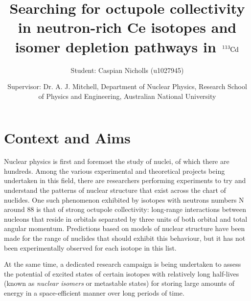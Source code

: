 \documentclass[12pt,a4paper]{article}
\begin{document}
\title{Searching for octupole collectivity in neutron-rich Ce isotopes and isomer depletion pathways in $\ce{^{113}Cd}$} %
\author{Student: Caspian Nicholls (u1027945)}
\date{Supervisor: Dr. A. J. Mitchell, Department of Nuclear Physics, Research School of Physics and Engineering, Australian National University}

%
%

\maketitle
\section*{Context and Aims}
\medskip
Nuclear physics is first and foremost the study of nuclei, of which there are hundreds. Among the various experimental and theoretical projects being undertaken in this field, there are researchers performing experiments to try and understand the patterns of nuclear structure that exist across the chart of nuclides. One such phenomenon exhibited by isotopes with neutrons numbers N around 88 is that of strong octupole collectivity: long-range interactions between nucleons that reside in orbitals separated by three units of both orbital and total angular momentum. Predictions based on models of nuclear structure have been made for the range of nuclides that should exhibit this behaviour, but it has not been experimentally observed for each isotope in this list.

\medskip
At the same time, a dedicated research campaign is being undertaken to assess the potential of excited states of certain isotopes with relatively long half-lives (known as \textit{nuclear isomers} or metastable states) for storing large amounts of energy in a space-efficient manner over long periods of time. 
\end{document}
